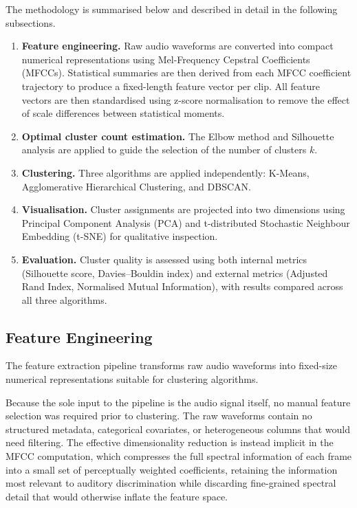 \documentclass[runningheads,a4paper,11pt]{report}
\begin{document}
The methodology is summarised below and described in detail in the following subsections.

\begin{enumerate}
    \item \textbf{Feature engineering.} Raw audio waveforms are converted into compact numerical representations using Mel-Frequency Cepstral Coefficients (MFCCs). Statistical summaries are then derived from each MFCC coefficient trajectory to produce a fixed-length feature vector per clip. All feature vectors are then standardised using z-score normalisation to remove the effect of scale differences between statistical moments.
    \item \textbf{Optimal cluster count estimation.} The Elbow method and Silhouette analysis are applied to guide the selection of the number of clusters $k$.
    \item \textbf{Clustering.} Three algorithms are applied independently: K-Means, Agglomerative Hierarchical Clustering, and DBSCAN.
    \item \textbf{Visualisation.} Cluster assignments are projected into two dimensions using Principal Component Analysis (PCA) and t-distributed Stochastic Neighbour Embedding (t-SNE) for qualitative inspection.
    \item \textbf{Evaluation.} Cluster quality is assessed using both internal metrics (Silhouette score, Davies--Bouldin index) and external metrics (Adjusted Rand Index, Normalised Mutual Information), with results compared across all three algorithms.
\end{enumerate}

\subsection{Feature Engineering}
The feature extraction pipeline transforms raw audio waveforms into fixed-size numerical representations suitable for clustering algorithms.

Because the sole input to the pipeline is the audio signal itself, no manual feature selection was required prior to clustering. The raw waveforms contain no structured metadata, categorical covariates, or heterogeneous columns that would need filtering. The effective dimensionality reduction is instead implicit in the MFCC computation, which compresses the full spectral information of each frame into a small set of perceptually weighted coefficients, retaining the information most relevant to auditory discrimination while discarding fine-grained spectral detail that would otherwise inflate the feature space.
\end{document}
